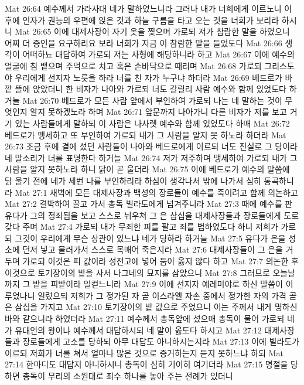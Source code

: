 Mat 26:64  예수께서 가라사대 네가 말하였느니라 그러나 내가 너희에게 이르노니 이 후에 인자가 권능의 우편에 앉은 것과 하늘 구름을 타고 오는 것을 너희가 보리라 하시니
Mat 26:65  이에 대제사장이 자기 옷을 찢으며 가로되 저가 참람한 말을 하였으니 어찌 더 증인을 요구하리요 보라 너희가 지금 이 참람한 말을 들었도다
Mat 26:66  생각이 어떠하뇨 대답하여 가로되 저는 사형에 해당하니라 하고
Mat 26:67  이에 예수의 얼굴에 침 뱉으며 주먹으로 치고 혹은 손바닥으로 때리며
Mat 26:68  가로되 그리스도야 우리에게 선지자 노릇을 하라 너를 친 자가 누구냐 하더라
Mat 26:69  베드로가 바깥 뜰에 앉았더니 한 비자가 나아와 가로되 너도 갈릴리 사람 예수와 함께 있었도다 하거늘
Mat 26:70  베드로가 모든 사람 앞에서 부인하여 가로되 나는 네 말하는 것이 무엇인지 알지 못하겠노라 하며
Mat 26:71  앞문까지 나아가니 다른 비자가 저를 보고 거기 있는 사람들에게 말하되 이 사람은 나사렛 예수와 함께 있었도다 하매
Mat 26:72  베드로가 맹세하고 또 부인하여 가로되 내가 그 사람을 알지 못 하노라 하더라
Mat 26:73  조금 후에 곁에 섰던 사람들이 나아와 베드로에게 이르되 너도 진실로 그 당이라 네 말소리가 너를 표명한다 하거늘
Mat 26:74  저가 저주하며 맹세하여 가로되 내가 그 사람을 알지 못하노라 하니 닭이 곧 울더라
Mat 26:75  이에 베드로가 예수의 말씀에 닭 울기 전에 네가 세번 나를 부인하리라 하심이 생각나서 밖에 나가서 심히 통곡하니라
Mat 27:1  새벽에 모든 대제사장과 백성의 장로들이 예수를 죽이려고 함께 의논하고
Mat 27:2  결박하여 끌고 가서 총독 빌라도에게 넘겨주니라
Mat 27:3  때에 예수를 판 유다가 그의 정죄됨을 보고 스스로 뉘우쳐 그 은 삼십을 대제사장들과 장로들에게 도로 갖다 주며
Mat 27:4  가로되 내가 무죄한 피를 팔고 죄를 범하였도다 하니 저희가 가로되 그것이 우리에게 무슨 상관이 있느냐 네가 당하라 하거늘
Mat 27:5  유다가 은을 성소에 던져 넣고 물러가서 스스로 목매어 죽은지라
Mat 27:6  대제사장들이 그 은을 거두며 가로되 이것은 피 값이라 성전고에 넣어 둠이 옳지 않다 하고
Mat 27:7  의논한 후 이것으로 토기장이의 밭을 사서 나그네의 묘지를 삼았으니
Mat 27:8  그러므로 오늘날까지 그 밭을 피밭이라 일컫느니라
Mat 27:9  이에 선지자 예레미야로 하신 말씀이 이루었나니 일렀으되 저희가 그 정가된 자 곧 이스라엘 자손 중에서 정가한 자의 가격 곧 은 삼십을 가지고
Mat 27:10  토기장이의 밭 값으로 주었으니 이는 주께서 내게 명하신 바와 같으니라 하였더라
Mat 27:11  예수께서 총독앞에 섰으매 총독이 물어 가로되 네가 유대인의 왕이냐 예수께서 대답하시되 네 말이 옳도다 하시고
Mat 27:12  대제사장들과 장로들에게 고소를 당하되 아무 대답도 아니하시는지라
Mat 27:13  이에 빌라도가 이르되 저희가 너를 쳐서 얼마나 많은 것으로 증거하는지 듣지 못하느냐 하되
Mat 27:14  한마디도 대답지 아니하시니 총독이 심히 기이히 여기더라
Mat 27:15  명절을 당하면 총독이 무리의 소원대로 죄수 하나를 놓아 주는 전례가 있더니
